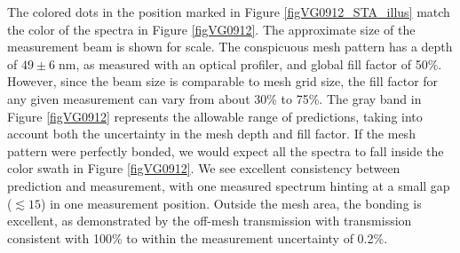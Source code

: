 The colored dots in the position marked in Figure \ref{figVG0912_STA_illus} match the color of the spectra in Figure \ref{figVG0912}.  The approximate size of the measurement beam is shown for scale.  The conspicuous mesh pattern has a depth of $49\pm6\;$nm, as measured with an optical profiler, and global fill factor of 50\%.  However, since the beam size is comparable to mesh grid size, the fill factor for any given measurement can vary from about 30\% to 75\%.  The gray band in Figure \ref{figVG0912} represents the allowable range of predictions, taking into account both the uncertainty in the mesh depth and fill factor.  If the mesh pattern were perfectly bonded, we would expect all the spectra to fall inside the color swath in Figure \ref{figVG0912}.  We see excellent consistency between prediction and measurement, with one measured spectrum hinting at a small gap ($\lesssim15$) in one measurement position.  Outside the mesh area, the bonding is excellent, as demonstrated by the off-mesh transmission with transmission consistent with 100\% to within the measurement uncertainty of 0.2\%.


